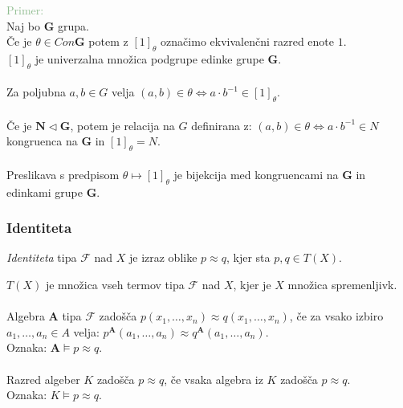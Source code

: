 \documentclass{beamer}
\begin{document}
\begin{frame}
    \textcolor{darkseagreen}{Primer:}\\
Naj bo $\mathbf{G}$ grupa. \\
Če je $\theta \in Con \mathbf{G}$ potem z $\left[1\right]_\theta$ označimo ekvivalenčni razred enote $1$.\\
$\left[1\right]_\theta$ je univerzalna množica podgrupe edinke grupe $\mathbf{G}$. \\~\\ 
Za poljubna $a, b \in G$ velja $\left(a, b\right) \in \theta \Leftrightarrow a \cdot b^{-1} \in \left[1\right]_\theta$.\\~\\
Če je $\mathbf{N} \vartriangleleft \mathbf{G}$, potem je relacija na $G$ definirana z:
$\left(a,b\right) \in \theta \Leftrightarrow a \cdot b^{-1} \in N$ kongruenca na $\mathbf{G}$ in $\left[1\right]_\theta= N$.\\~\\
Preslikava s predpisom $\theta \mapsto \left[1\right]_\theta$ je bijekcija med kongruencami na $\mathbf{G}$ in edinkami grupe $\mathbf{G}$.\\
\end{frame}
\begin{frame}
\frametitle{Identiteta}
    \begin{block}{}
        \emph{Identiteta} tipa $\mathcal{F}$ nad $X$ je izraz oblike $p\approx q$, kjer sta $p, q \in T\left(X\right)$. 
    \end{block}
    $T\left(X\right)$ je množica vseh termov tipa $\mathcal{F}$ nad $X$, kjer je $X$ množica spremenljivk.\\~\\
    Algebra $\mathbf{A}$ tipa $\mathcal{F}$ zadošča $p\left(x_1, \ldots, x_n\right)\approx q\left(x_1, \ldots, x_n\right)$,
    če za vsako izbiro $a_1, \ldots, a_n \in A$ velja: $p^\mathbf{A}\left(a_1, \ldots, a_n\right) \approx q^\mathbf{A}\left(a_1, \ldots, a_n\right)$.\\
    Oznaka: $\mathbf{A} \models p\approx q$.\\~\\
    Razred algeber $K$ zadošča $p\approx q$, če vsaka algebra iz $K$ zadošča $p\approx q$. \\
    Oznaka: $K \models p\approx q$.
\end{frame}
\end{document}
